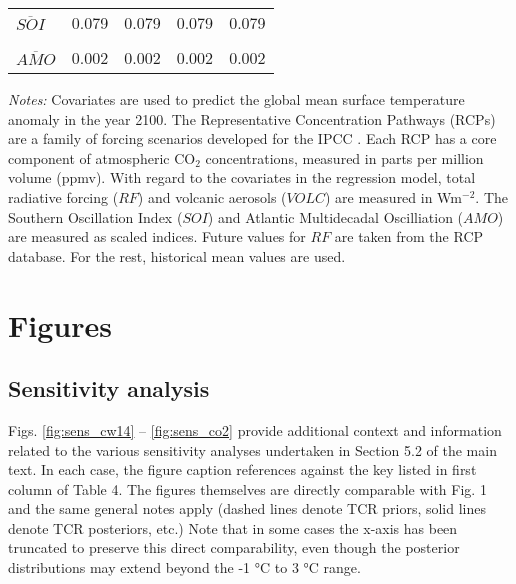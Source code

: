 \documentclass[
]{article}
\begin{document}
\begin{table}[h]
\begin{threeparttable}
\begin{tabularx}{.75\textwidth}{@{\extracolsep{1pt}} X A A A A }
            \\[-1.8ex] 
            $\overline{SOI}$                                                                    &\text{-}0.079  &\text{-}0.079  &\text{-}0.079  &\text{-}0.079  \\
            \\[-1.8ex] 
            $\overline{AMO}$                                                                    &\text{-}0.002 &\text{-}0.002   &\text{-}0.002  &\text{-}0.002  \\
            \bottomrule
        \end{tabularx}
        \begin{tablenotes}
            \footnotesize
            \item \textit{Notes:} Covariates are used to predict the global mean surface temperature anomaly in the year 2100. The Representative Concentration Pathways (RCPs) are a family of forcing scenarios developed for the IPCC \cite{van2011rcp}. Each RCP has a core component of atmospheric CO$_2$ concentrations, measured in parts per million volume (ppmv). With regard to the covariates in the regression model, total radiative forcing ($RF$) and volcanic aerosols ($VOLC$) are measured in Wm$^{-2}$. The Southern Oscillation Index ($SOI$) and Atlantic Multidecadal Oscilliation ($AMO$) are measured as scaled indices. Future values for $RF$ are taken from the RCP database. For the rest, historical mean values are used.
        \end{tablenotes}
    \end{threeparttable} 
    \label{tab:covariate}
\end{table}

\newpage
\pagebreak

\hypertarget{figures}{%
\section{Figures}\label{figures}}

\hypertarget{sensitivity-analysis-1}{%
\subsection{Sensitivity analysis}\label{sensitivity-analysis-1}}

Figs. \ref{fig:sens_cw14} -- \ref{fig:sens_co2} provide additional
context and information related to the various sensitivity analyses
undertaken in Section 5.2 of the main text. In each case, the figure
caption references against the key listed in first column of Table 4.
The figures themselves are directly comparable with Fig. 1 and the same
general notes apply (dashed lines denote TCR priors, solid lines denote
TCR posteriors, etc.) Note that in some cases the x-axis has been
truncated to preserve this direct comparability, even though the
posterior distributions may extend beyond the -1 °C to 3 °C range.
\end{document}
